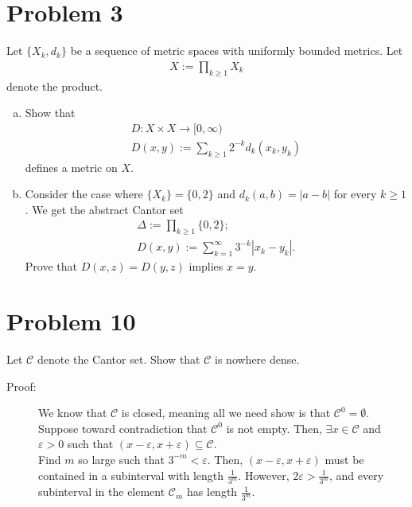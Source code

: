 \documentclass[8pt]{extarticle}
\begin{document}
  \section{Problem 3}%
  Let $\{X_k,d_k\}$ be a sequence of metric spaces with uniformly bounded metrics. Let
  \begin{align*}
    X := \prod_{k\geq 1} X_k
  \end{align*}
  denote the product.
  \begin{enumerate}[(a)]
    \item Show that
      \begin{align*}
        D: X\times X \rightarrow [0,\infty)\\
        D(x,y) := \sum_{k\geq1}2^{-k}d_k(x_k,y_k)
      \end{align*}
      defines a metric on $X$.
    \item Consider the case where $\{X_k\} = \{0,2\}$ and $d_k(a,b) = |a-b|$ for every $k\geq 1$. We get the abstract Cantor set
      \begin{align*}
        \Delta := \prod_{k\geq 1} \{0,2\};\\
        D(x,y) := \sum_{k=1}^{\infty}3^{-k}|x_k - y_k|.
      \end{align*}
      Prove that $D(x,z) = D(y,z)$ implies $x=y$.
  \end{enumerate}
  \section{Problem 10}%
  Let $\mathcal{C}$ denote the Cantor set. Show that $\mathcal{C}$ is nowhere dense.
  \begin{description}
    \item[Proof:] We know that $\mathcal{C}$ is closed, meaning all we need show is that $\mathcal{C}^{0} = \emptyset$.\\

      Suppose toward contradiction that $\mathcal{C}^{0}$ is not empty. Then, $\exists x\in \mathcal{C}$ and $\varepsilon > 0$ such that $(x-\varepsilon, x+\varepsilon) \subseteq \mathcal{C}$.\\

      Find $m$ so large such that $3^{-m} < \varepsilon$. Then, $(x-\varepsilon, x + \varepsilon)$ must be contained in a subinterval with length $\frac{1}{3^m}$. However, $2\varepsilon > \frac{1}{3^m}$, and every subinterval in the element $\mathcal{C}_m$ has length $\frac{1}{3^m}$.
  \end{description}
\end{document}

